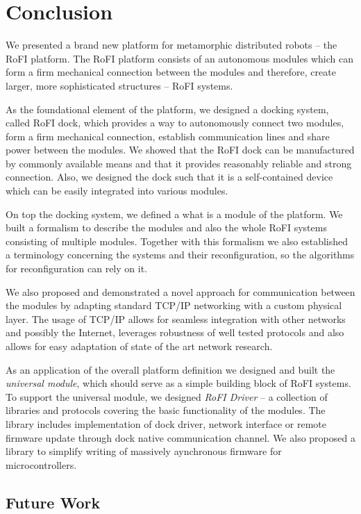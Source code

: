 \chapter{Conclusion}\label{chap:conclusion}

We presented a brand new platform for metamorphic distributed robots -- the RoFI
platform. The RoFI platform consists of an autonomous modules which can form a
firm mechanical connection between the modules and therefore, create larger,
more sophisticated structures -- RoFI systems.

As the foundational element of the platform, we designed a docking system,
called RoFI dock, which provides a way to autonomously connect two modules, form
a firm mechanical connection, establish communication lines and share power
between the modules. We showed that the RoFI dock can be manufactured by
commonly available means and that it provides reasonably reliable and strong
connection. Also, we designed the dock such that it is a self-contained device
which can be easily integrated into various modules.

On top the docking system, we defined a what is a module of the platform. We
built a formalism to describe the modules and also the whole RoFI systems
consisting of multiple modules. Together with this formalism we also established
a terminology concerning the systems and their reconfiguration, so the
algorithms for reconfiguration can rely on it.

We also proposed and demonstrated a novel approach for communication between the
modules by adapting standard TCP/IP networking with a custom physical layer. The
usage of TCP/IP allows for seamless integration with other networks and possibly
the Internet, leverages robustness of well tested protocols and also allows for
easy adaptation of state of the art network research.

As an application of the overall platform definition we designed and built the
\emph{universal module}, which should serve as a simple building block of RoFI
systems. To support the universal module, we designed \emph{RoFI Driver} -- a
collection of libraries and protocols covering the basic functionality of the
modules. The library includes implementation of dock driver, network interface
or remote firmware update through dock native communication channel. We also
proposed a library to simplify writing of massively aynchronous firmware for
microcontrollers.

\section{Future Work}

